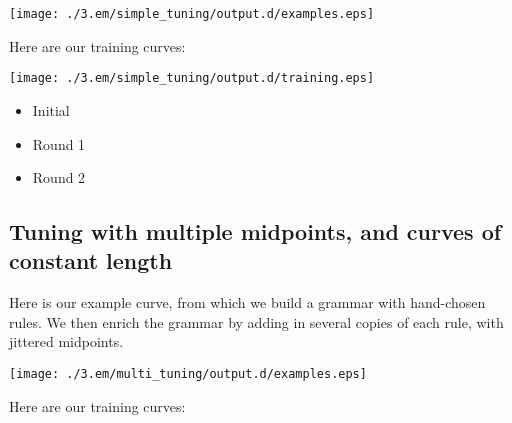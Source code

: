 \documentclass{book}
\begin{document}
\texttt{[image: ./3.em/simple\_tuning/output.d/examples.eps]}

Here are our training curves:

\texttt{[image: ./3.em/simple\_tuning/output.d/training.eps]}
\begin{itemize}

\item Initial\\
\label{sec-2_4_1_1}%


\item Round 1\\
\label{sec-2_4_1_2}%


\item Round 2\\
\label{sec-2_4_1_3}%


\end{itemize} %
\subsection{Tuning with multiple midpoints, and curves of constant length}
\label{sec-2_4_2}


Here is our example curve, from which we build a grammar with
hand-chosen rules. We then enrich the grammar by adding in several
copies of each rule, with jittered midpoints.

\texttt{[image: ./3.em/multi\_tuning/output.d/examples.eps]}

Here are our training curves:
\end{document}
